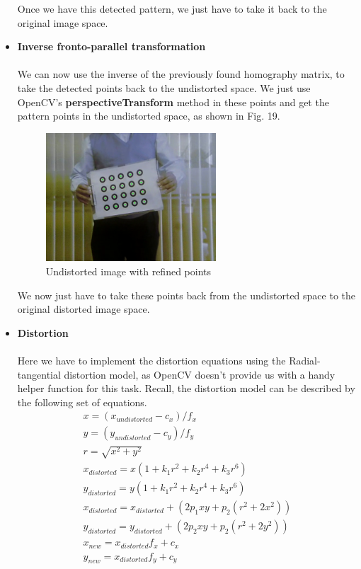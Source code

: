 \documentclass[journal]{IEEEtran}
\begin{document}
\begin{itemize}
        Once we have this detected pattern, we just have to take it back to the original image space.
        \\

    \item \textbf{Inverse fronto-parallel transformation}
        \\
        \\
        We can now use the inverse of the previously found homography matrix, to take the detected points back to the undistorted space. We just use OpenCV's \textbf{perspectiveTransform} method in these points and get the pattern points in the undistorted space, as shown in Fig. 19.

        \begin{figure}[H]
        \centering
        \includegraphics[width=2.5in]{_img/report_4/img_refinement_inverse_perspective.png}
        \caption{Undistorted image with refined points}
        \end{figure}        

        We now just have to take these points back from the undistorted space to the original distorted image space.
        \\

    \item \textbf{Distortion}
        \\
        \\
        Here we have to implement the distortion equations using the Radial-tangential distortion model, as OpenCV doesn't provide us with a handy helper function for this task. Recall, the distortion model can be described by the following set of equations.
        \begin{gather*}
            x = ( x_{undistorted} - c_{x} ) / f_{x}\\
            y = ( y_{undistorted} - c_{y} ) / f_{y}\\
            r = \sqrt{ x^{2} + y^{2} } \\
            x_{distorted} = x ( 1 + k_{1} r^{2} + k_{2} r^{4} + k_{3} r^{6} )\\
            y_{distorted} = y ( 1 + k_{1} r^{2} + k_{2} r^{4} + k_{3} r^{6} )\\
            x_{distorted} = x_{distorted} + ( 2 p_{1} x y + p_{2} ( r^{2} + 2 x^{2} ) )\\
            y_{distorted} = y_{distorted} + ( 2 p_{2} x y + p_{2} ( r^{2} + 2 y^{2} ) )\\
            x_{new} = x_{distorted} f_{x} + c_{x}\\
            y_{new} = x_{distorted} f_{y} + c_{y}\\
        \end{gather*}


\end{itemize}
\end{document}

